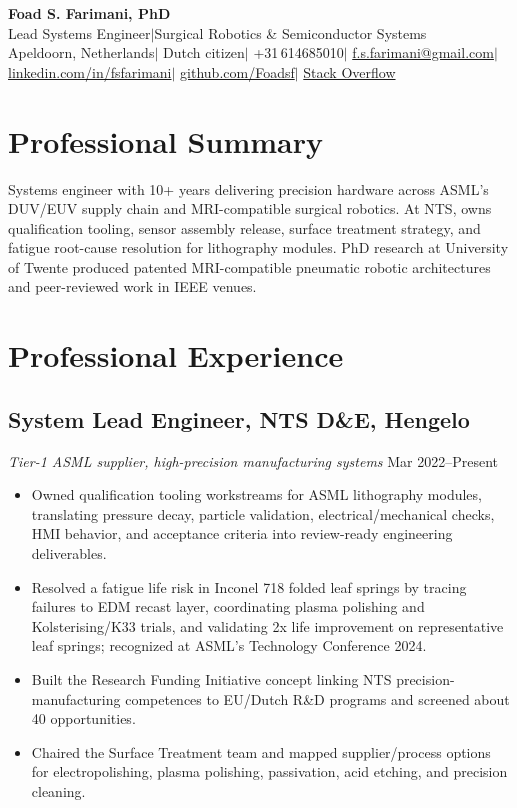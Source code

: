 \documentclass[11pt,a4paper]{article}
\begin{document}
\begin{center}
 {\LARGE\bfseries Foad S. Farimani, PhD} \\[4pt]
 {\small Lead Systems Engineer\enspace$\mid$\enspace Surgical Robotics \& Semiconductor Systems}
 \\[6pt]
 {\small
  Apeldoorn, Netherlands\enspace$\mid$\enspace
  Dutch citizen\enspace$\mid$\enspace
  +31\,614685010\enspace$\mid$\enspace
  \href{mailto:f.s.farimani@gmail.com}{f.s.farimani@gmail.com}\enspace$\mid$\enspace
  \href{https://linkedin.com/in/fsfarimani}{linkedin.com/in/fsfarimani}\enspace$\mid$\enspace
  \href{https://github.com/Foadsf}{github.com/Foadsf}\enspace$\mid$\enspace
  \href{https://stackoverflow.com/users/4999991}{Stack Overflow}
 }
\end{center}

\section{Professional Summary}
Systems engineer with 10+ years delivering precision hardware across ASML's DUV/EUV supply chain and MRI-compatible surgical robotics. At NTS, owns qualification tooling, sensor assembly release, surface treatment strategy, and fatigue root-cause resolution for lithography modules. PhD research at University of Twente produced patented MRI-compatible pneumatic robotic architectures and peer-reviewed work in IEEE venues.

\section{Professional Experience}

\subsection{System Lead Engineer, NTS D\&E, Hengelo}
{\small\textit{Tier-1 ASML supplier, high-precision manufacturing systems}} \hfill {\small Mar 2022--Present}
\begin{itemize}
 \item Owned qualification tooling workstreams for ASML lithography modules, translating pressure decay, particle validation, electrical/mechanical checks, HMI behavior, and acceptance criteria into review-ready engineering deliverables.
 \item Resolved a fatigue life risk in Inconel 718 folded leaf springs by tracing failures to EDM recast layer, coordinating plasma polishing and Kolsterising/K33 trials, and validating 2x life improvement on representative leaf springs; recognized at ASML's Technology Conference 2024.
 \item Built the Research Funding Initiative concept linking NTS precision-manufacturing competences to EU/Dutch R\&D programs and screened about 40 opportunities.
 \item Chaired the Surface Treatment team and mapped supplier/process options for electropolishing, plasma polishing, passivation, acid etching, and precision cleaning.
\end{itemize}
\end{document}
